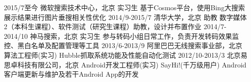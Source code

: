 \documentclass[]{friggeri-cv-cn}
\begin{document}
\begin{entrylist}
  \entry
    {2015/7至今}
    {微软搜索技术中心，北京}
    {实习生}
    {基于Cosmos平台，使用Bing大搜索展示结果进行图片垂搜相关性优化}
  \entry
    {2014/9-2015/7}
    {清华大学，北京}
    {助教}
    {数字媒体2（本科生课程）、软件测试（研究生课程）助教，设计并布置作业}
  \entry
    {2014/7-2014/10}
    {神马搜索，北京}
    {实习生}
    {参与转码小组日常工作，负责开发转码效果监控、黑白名单及配置管理等工具}
  \entry
    {2013/6-2013/9}
    {阿里巴巴无线搜索事业部，北京}
    {算法工程师(实习)}
    {Hubble抓取系统功能及性能自动化测试}
  \entry
    {2012/10-2013/3}
    {北京易思卓科技有限公司，北京}
    {Android开发工程师(实习)}
    {SayHi!(千万级用户) Android客户端更新与维护及若干Android App的开发}
\end{entrylist}
\end{document}
